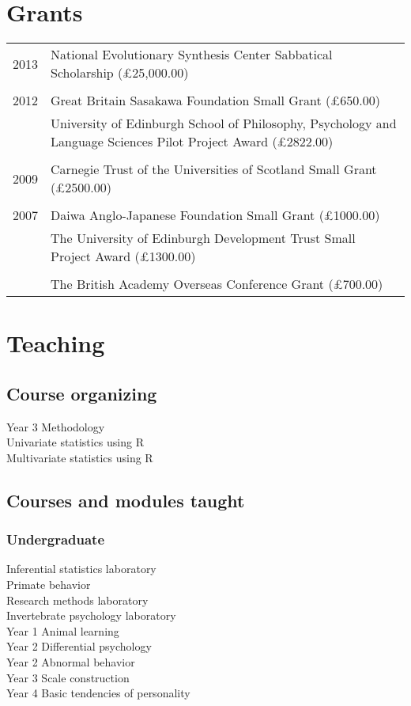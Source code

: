 \documentclass[11pt]{article}
\begin{document}
\section*{Grants}
\begin{tabular}{p{3cm}p{12cm}}
2013 & National Evolutionary Synthesis Center Sabbatical Scholarship
(£25,000.00) \\ \\
2012 & Great Britain Sasakawa Foundation Small Grant (£650.00) \\
& University of Edinburgh School of Philosophy, Psychology and
Language Sciences Pilot Project Award (£2822.00) \\ \\
2009 & Carnegie Trust of the Universities of Scotland Small Grant
(£2500.00) \\ \\
2007 & Daiwa Anglo-Japanese Foundation Small Grant (£1000.00) \\ 
& The University of Edinburgh Development Trust Small Project Award
(£1300.00) \\ \\
& The British Academy Overseas Conference Grant (£700.00)
\end{tabular}

\section*{Teaching}
\subsection*{Course organizing}
Year 3 Methodology \\
Univariate statistics using R \\
Multivariate statistics using R

\subsection*{Courses and modules taught}
\subsubsection*{Undergraduate}
Inferential statistics laboratory \\
Primate behavior \\
Research methods laboratory \\
Invertebrate psychology laboratory \\
Year 1 Animal learning \\
Year 2 Differential psychology \\
Year 2 Abnormal behavior \\
Year 3 Scale construction \\
Year 4 Basic tendencies of personality
\end{document}
